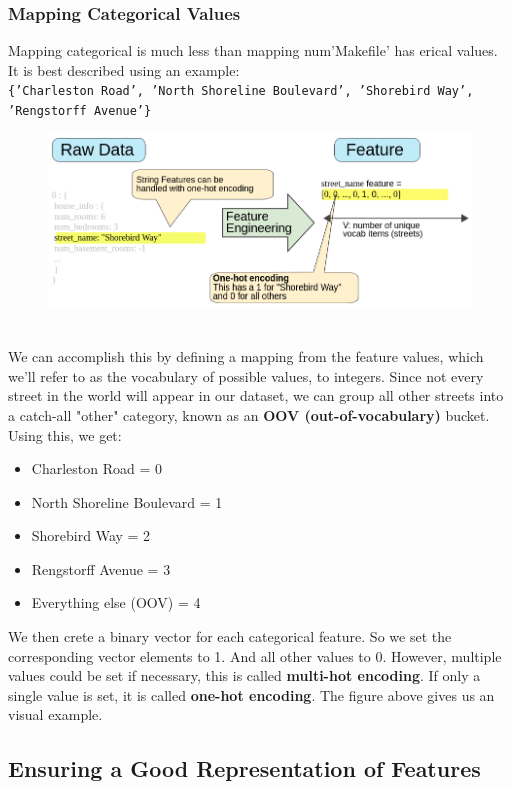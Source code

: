 \documentclass[12pt]{article}
\begin{document}
\subsubsection{Mapping Categorical Values}
Mapping categorical is much less than mapping num'Makefile' has erical values. It is best described using an example:
\\
{\tt{\{'Charleston Road', 'North Shoreline Boulevard', 'Shorebird Way', 'Rengstorff Avenue'}\}}
\begin{figure}[h]
	\includegraphics[scale = 0.5]{imgs/RawToStringFeature.png}
	\centering
	\caption{}
\end{figure}
\\We can accomplish this by defining a mapping from the feature values, which we'll refer to as the vocabulary of possible values, to integers. Since not every street in the world will appear in our dataset, we can group all other streets into a catch-all "other" category, known as an \textbf{OOV (out-of-vocabulary)} bucket.
\\Using this, we get:
\begin{itemize}
	\item Charleston Road = 0
	\item North Shoreline Boulevard = 1
	\item Shorebird Way = 2
	\item Rengstorff Avenue = 3
	\item Everything else (OOV) = 4
\end{itemize}
We then crete a binary vector for each categorical feature. So we set the corresponding vector elements to 1. And all other values to 0. However, multiple values could be set if necessary, this is called \textbf{multi-hot encoding}. If only a single value is set, it is called \textbf{one-hot encoding}. The figure above gives us an visual example.

\subsection{Ensuring a Good Representation of Features}
\end{document}
